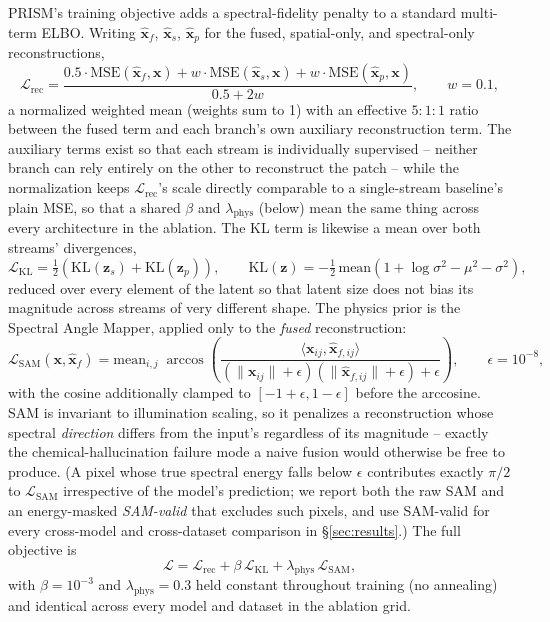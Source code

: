 \documentclass{article} %
\begin{document}
PRISM's training objective adds a spectral-fidelity penalty to a standard multi-term ELBO. Writing $\hat{\mathbf{x}}_f$, $\hat{\mathbf{x}}_s$, $\hat{\mathbf{x}}_p$ for the fused, spatial-only, and spectral-only reconstructions,
\begin{equation}
\mathcal{L}_{\mathrm{rec}} = \frac{0.5 \cdot \mathrm{MSE}(\hat{\mathbf{x}}_f, \mathbf{x}) + w \cdot \mathrm{MSE}(\hat{\mathbf{x}}_s, \mathbf{x}) + w \cdot \mathrm{MSE}(\hat{\mathbf{x}}_p, \mathbf{x})}{0.5 + 2w}, \qquad w = 0.1,
\end{equation}
a normalized weighted mean (weights sum to 1) with an effective $5{:}1{:}1$ ratio between the fused term and each branch's own auxiliary reconstruction term. The auxiliary terms exist so that each stream is individually supervised -- neither branch can rely entirely on the other to reconstruct the patch -- while the normalization keeps $\mathcal{L}_{\mathrm{rec}}$'s scale directly comparable to a single-stream baseline's plain MSE, so that a shared $\beta$ and $\lambda_{\mathrm{phys}}$ (below) mean the same thing across every architecture in the ablation. The KL term is likewise a mean over both streams' divergences,
\begin{equation}
\mathcal{L}_{\mathrm{KL}} = \tfrac{1}{2}\left(\mathrm{KL}(\mathbf{z}_s) + \mathrm{KL}(\mathbf{z}_p)\right), \qquad \mathrm{KL}(\mathbf{z}) = -\tfrac{1}{2}\,\mathrm{mean}\left(1 + \log\sigma^2 - \mu^2 - \sigma^2\right),
\end{equation}
reduced over every element of the latent so that latent size does not bias its magnitude across streams of very different shape. The physics prior is the Spectral Angle Mapper, applied only to the \emph{fused} reconstruction:
\begin{equation}
\mathcal{L}_{\mathrm{SAM}}(\mathbf{x}, \hat{\mathbf{x}}_f) = \mathrm{mean}_{i,j}\; \arccos\!\left(\frac{\langle \mathbf{x}_{ij}, \hat{\mathbf{x}}_{f,ij}\rangle}{\left(\lVert\mathbf{x}_{ij}\rVert + \epsilon\right)\left(\lVert\hat{\mathbf{x}}_{f,ij}\rVert + \epsilon\right) + \epsilon}\right), \qquad \epsilon = 10^{-8},
\end{equation}
with the cosine additionally clamped to $[-1+\epsilon, 1-\epsilon]$ before the arccosine. SAM is invariant to illumination scaling, so it penalizes a reconstruction whose spectral \emph{direction} differs from the input's regardless of its magnitude -- exactly the chemical-hallucination failure mode a naive fusion would otherwise be free to produce. (A pixel whose true spectral energy falls below $\epsilon$ contributes exactly $\pi/2$ to $\mathcal{L}_{\mathrm{SAM}}$ irrespective of the model's prediction; we report both the raw SAM and an energy-masked \emph{SAM-valid} that excludes such pixels, and use SAM-valid for every cross-model and cross-dataset comparison in \S\ref{sec:results}.) The full objective is
\begin{equation}
\mathcal{L} = \mathcal{L}_{\mathrm{rec}} + \beta\,\mathcal{L}_{\mathrm{KL}} + \lambda_{\mathrm{phys}}\,\mathcal{L}_{\mathrm{SAM}},
\end{equation}
with $\beta = 10^{-3}$ and $\lambda_{\mathrm{phys}} = 0.3$ held constant throughout training (no annealing) and identical across every model and dataset in the ablation grid.
\end{document}
